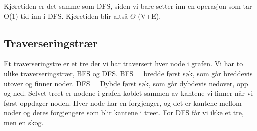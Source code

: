 \documentclass[12pt]{report}
\begin{document}

\par


\vspace{\baselineskip}
Kjøretiden er det samme som DFS, siden vi bare setter inn en operasjon som tar O(1) tid inn i DFS. Kjøretiden blir altså $ \Theta $ (V+E). \par


\vspace{\baselineskip}

\vspace{\baselineskip}

\vspace{\baselineskip}

\vspace{\baselineskip}

\vspace{\baselineskip}

\vspace{\baselineskip}

\vspace{\baselineskip}

\vspace{\baselineskip}

\vspace{\baselineskip}

\vspace{\baselineskip}

\vspace{\baselineskip}
\setlength{\parskip}{6.0pt}

\vspace{\baselineskip}\subsection*{Traverseringstrær}
Et traverseringstre er et tre der vi har traversert hver node i grafen. Vi har to ulike traverseringstrær, BFS og DFS. BFS = bredde først søk, som går breddevis utover og finner noder. DFS = Dybde først søk, som går dybdevis nedover, opp og ned. Selvet treet er nodene i grafen koblet sammen av kantene vi finner når vi først oppdager noden. Hver node har en forgjenger, og det er kantene mellom noder og deres forgjengere som blir kantene i treet. For DFS får vi ikke et tre, men en skog. \par


\vspace{\baselineskip}
\end{document}

